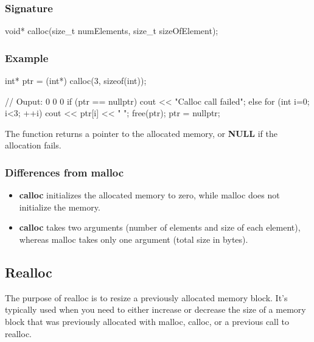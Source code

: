 \documentclass{report}
\begin{document}
    \subsubsection{Signature}
    \bigbreak \noindent 
    \begin{cppcode}
        void* calloc(size_t numElements, size_t sizeOfElement);
    \end{cppcode}
    \bigbreak \noindent 
    \subsubsection{Example}
    \bigbreak \noindent 
    \begin{cppcode}
    int* ptr = (int*) calloc(3, sizeof(int));

    // Ouput: 0 0 0
    if (ptr == nullptr) { cout << "Calloc call failed";
    } else {
        for (int i=0; i<3; ++i)  {
            cout << ptr[i] << " ";
        }
    }
    free(ptr);
    ptr = nullptr;
    \end{cppcode}

    \bigbreak \noindent 
    The function returns a pointer to the allocated memory, or \textbf{NULL} if the allocation fails.
    \bigbreak \noindent 
    \subsubsection{Differences from malloc}
    \bigbreak \noindent 
    \begin{itemize}
        \item \textbf{calloc} initializes the allocated memory to zero, while malloc does not initialize the memory.
        \item \textbf{calloc} takes two arguments (number of elements and size of each element), whereas malloc takes only one argument (total size in bytes).
    \end{itemize}

    \bigbreak \noindent 
    \subsection{Realloc}
    \bigbreak \noindent 
    \begin{concept}
       The purpose of realloc is to resize a previously allocated memory block. It's typically used when you need to either increase or decrease the size of a memory block that was previously allocated with malloc, calloc, or a previous call to realloc. 
    \end{concept}
    \bigbreak \noindent 
\end{document}
